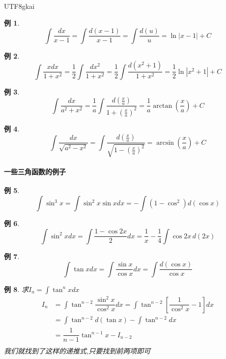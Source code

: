 \documentclass{article}
\newtheorem{example}{例}[subsection]
\begin{document}
\begin{CJK}{UTF8}{gkai}
\begin{example}
  \[\int \dfrac{dx}{x-1} = \int \dfrac{d(x-1)}{x-1}=\int \dfrac{d(u)}{u}=\ln|x-1| + C \]
\end{example}

\begin{example}
  \[\int \dfrac{xdx}{1+x^2} = \dfrac{1}{2}\int \dfrac{dx^2}{1+x^2}=\dfrac{1}{2}\int \dfrac{d(x^2+1)}{1+x^2}= \dfrac{1}{2}\ln|x^2 + 1 | + C\]
\end{example}

\begin{example}
  \[\int \dfrac{dx}{a^2 + x^2} =\dfrac{1}{a}\int \dfrac{d(\frac{x}{a})}{1 + (\frac{x}{a})^2} = \dfrac{1}{a} \arctan (\dfrac{x}{a}) + C\]
\end{example}

\begin{example}
  \[\int \dfrac{dx}{\sqrt{a^2 - x^2}} = \int \dfrac{d(\frac{x}{a})}{\sqrt{1-(\frac{x}{a})^2}} = \arcsin (\dfrac{x}{a}) + C\]
\end{example}

\paragraph{一些三角函数的例子}
\begin{example}
  \[\int \sin^3 x = \int \sin^2 x \sin x dx = -\int(1- \cos^2) d(\cos x)\]
\end{example}

\begin{example}
  \[\int \sin^2 x dx = \int \dfrac{1-\cos 2x}{2} dx = \dfrac{1}{x} - \dfrac{1}{4}\int \cos 2x\, d(2x)\]
\end{example}
\begin{example}
  \[\int \tan x dx = \int \dfrac{\sin x}{\cos x} dx = \int \dfrac{d(\cos x )}{\cos x}\]
\end{example}

\begin{example}
  求$I_n = \int \tan^n x dx$\\
  \[
  \begin{aligned}  
  I_n &= \int \tan^{n-2} \dfrac{\sin^2 x}{\cos^2 x}dx = \int \tan^{n-2} [\dfrac{1}{\cos^2 x} - 1]dx \\
  &= \int \tan^{n-2} d(\tan x) - \int \tan^{n-2}dx\\ 
  &= \dfrac{1}{n-1} \tan^{n-1} x - I_{n-2}\\
  \end{aligned}
  \]
  我们就找到了这样的递推式,只要找到前两项即可\\
\end{example}


\end{CJK}
\end{document}
